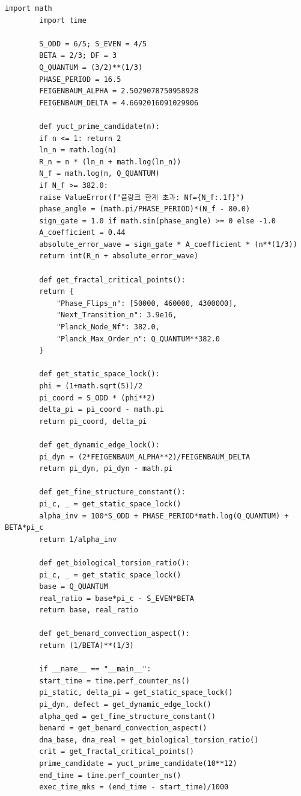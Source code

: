\documentclass[12pt,a4paper]{article}
\begin{document}
	\begin{lstlisting}[caption={완전한 YUCT 조정 엔진 v4.0 (\texttt{yuct\_constants.py})}, label={lst:yuct-engine}]
		import math
		import time
		
		S_ODD = 6/5; S_EVEN = 4/5
		BETA = 2/3; DF = 3
		Q_QUANTUM = (3/2)**(1/3)
		PHASE_PERIOD = 16.5
		FEIGENBAUM_ALPHA = 2.5029078750958928
		FEIGENBAUM_DELTA = 4.6692016091029906
		
		def yuct_prime_candidate(n):
		if n <= 1: return 2
		ln_n = math.log(n)
		R_n = n * (ln_n + math.log(ln_n))
		N_f = math.log(n, Q_QUANTUM)
		if N_f >= 382.0:
		raise ValueError(f"플랑크 한계 초과: Nf={N_f:.1f}")
		phase_angle = (math.pi/PHASE_PERIOD)*(N_f - 80.0)
		sign_gate = 1.0 if math.sin(phase_angle) >= 0 else -1.0
		A_coefficient = 0.44
		absolute_error_wave = sign_gate * A_coefficient * (n**(1/3))
		return int(R_n + absolute_error_wave)
		
		def get_fractal_critical_points():
		return {
			"Phase_Flips_n": [50000, 460000, 4300000],
			"Next_Transition_n": 3.9e16,
			"Planck_Node_Nf": 382.0,
			"Planck_Max_Order_n": Q_QUANTUM**382.0
		}
		
		def get_static_space_lock():
		phi = (1+math.sqrt(5))/2
		pi_coord = S_ODD * (phi**2)
		delta_pi = pi_coord - math.pi
		return pi_coord, delta_pi
		
		def get_dynamic_edge_lock():
		pi_dyn = (2*FEIGENBAUM_ALPHA**2)/FEIGENBAUM_DELTA
		return pi_dyn, pi_dyn - math.pi
		
		def get_fine_structure_constant():
		pi_c, _ = get_static_space_lock()
		alpha_inv = 100*S_ODD + PHASE_PERIOD*math.log(Q_QUANTUM) + BETA*pi_c
		return 1/alpha_inv
		
		def get_biological_torsion_ratio():
		pi_c, _ = get_static_space_lock()
		base = Q_QUANTUM
		real_ratio = base*pi_c - S_EVEN*BETA
		return base, real_ratio
		
		def get_benard_convection_aspect():
		return (1/BETA)**(1/3)
		
		if __name__ == "__main__":
		start_time = time.perf_counter_ns()
		pi_static, delta_pi = get_static_space_lock()
		pi_dyn, defect = get_dynamic_edge_lock()
		alpha_qed = get_fine_structure_constant()
		benard = get_benard_convection_aspect()
		dna_base, dna_real = get_biological_torsion_ratio()
		crit = get_fractal_critical_points()
		prime_candidate = yuct_prime_candidate(10**12)
		end_time = time.perf_counter_ns()
		exec_time_mks = (end_time - start_time)/1000
		

\end{lstlisting}
\end{document}
